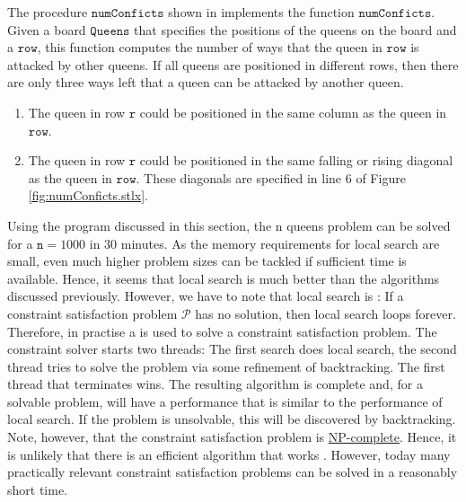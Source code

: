 The procedure $\texttt{numConficts}$ shown in  implements the function
$\texttt{numConficts}$.  Given a board $\texttt{Queens}$ that specifies the positions of the queens on the
board and a $\texttt{row}$, this function computes the number of ways that the queen in $\texttt{row}$ is
attacked by other queens.  If all queens are positioned in different rows, then there are only three ways left
that a queen can be attacked by another queen.
\begin{enumerate}
\item The queen in row $\texttt{r}$ could be positioned in the same column as the queen in $\texttt{row}$.
\item The queen in row $\texttt{r}$ could be positioned in the same falling or rising diagonal as the queen in
      $\texttt{row}$.  These diagonals are specified in line 6 of Figure \ref{fig:numConficts.stlx}.
\end{enumerate}
Using the program discussed in this section, the n queens problem can be solved for a $\texttt{n} = 1000$ in
30 minutes.  As the memory requirements for local search are small, even much higher problem sizes can be
tackled if sufficient time is available.  Hence, it seems that local search is much better than the algorithms
discussed previously.  However, we have to note that local search is :  If a
constraint satisfaction problem $\mathcal{P}$ has no solution, then local search loops forever.  Therefore, in
practise a  is used to solve a constraint satisfaction problem.  The constraint solver
starts two threads: The first search does local search, the second thread tries to solve the problem via some
refinement of backtracking.  The first thread that terminates wins.  The resulting algorithm is complete and,
for a solvable problem, will have a performance that is similar to the performance of local search.  If the
problem is unsolvable, this will   be discovered by backtracking.  Note, however, that the
constraint satisfaction problem is \href{https://en.wikipedia.org/wiki/NP-completeness}{NP-complete}.  Hence,
it is unlikely that there is an efficient algorithm that works .  However, today many practically
relevant constraint satisfaction problems can be solved in a reasonably short time. 

